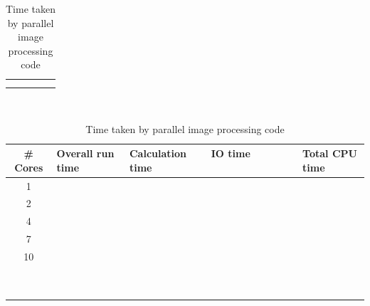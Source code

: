 \documentclass{article}
\begin{document}
\begin{table}[h]
\begin{center}
\begin{tabular}{|c|l|l|l|l|}
\hline
 & & & & \\
\hline
 & & & & \\
\hline
 & & & & \\
\hline
\end{tabular}
\ \\
\begin{tabular}{|c|l|l|l|l|}
\hline
\# Cores & Overall run time & Calculation time & IO time \ \ \ \ \
\ \ \ \
\ & Total
CPU time \\
\hline
\hline
1 & & & & \\
\hline
2 & & & & \\
\hline
4 & & & & \\
\hline
7 & & & & \\
\hline
10 & & & & \\
\hline
 & & & & \\
\hline
 & & & & \\
\hline
 & & & & \\
\hline
 & & & & \\
\hline
 & & & & \\
\hline
 & & & & \\
\hline
 & & & & \\
\hline
 & & & & \\
\hline
 & & & & \\
\hline
\end{tabular}
\caption{\label{tab:timings} Time taken by parallel image processing code}
\end{center}
\end{table}
\end{document}
